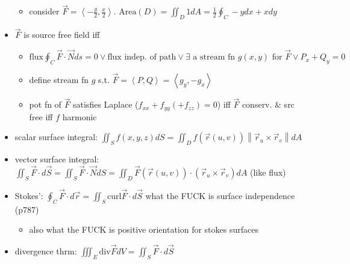\documentclass[11pt]{article}
\theoremstyle{definition}
\newcommand{\magn}[1]{\left\lVert #1 \right\rVert}
\begin{document}
\begin{itemize}
\begin{itemize}
    \item consider $\vec{F}=\left<-\frac{y}{2},\frac{x}{2}\right>$. $\text{Area}(D)=\iint_D1dA = \frac{1}{2}\oint_C -ydx+xdy$
  \end{itemize}
  \item $\vec{F}$ is source free field iff 
  \begin{itemize}
    \item $\text{flux} \oint_C\vec{F}\cdot\vec{N}ds = 0 \lor \text{flux indep. of path} \lor \exists\text{ a stream fn } g(x,y) \text{ for } \vec{F} \lor P_x+Q_y=0$
    \item define stream fn $g$ s.t. $\vec{F} = \left<P,Q\right> = \left<g_y,-g_x\right>$
    \item pot fn of $\vec{F}$ satisfies Laplace ($f_{xx}+f_{yy}(+f_{zz})=0$) iff $\vec{F}$ conserv. \& src free iff $f$ harmonic
  \end{itemize}
  \vspace*{-1em}
  \item scalar surface integral: $\iint_S f(x,y,z)dS = \iint_D f(\vec{r}(u,v))\magn{\vec{r}_u\times\vec{r}_v}dA$
  \item vector surface integral: $\iint_S \vec{F}\cdot d\vec{S} = \iint_S \vec{F}\cdot\vec{N}dS = \iint_D \vec{F}(\vec{r}(u,v))\cdot(\vec{r}_u \times\vec{r}_v) dA$ (like flux)
  \item Stokes': $\oint_C \vec{F}\cdot d\vec{r} = \iint_S \text{curl}\vec{F}\cdot d\vec{S}$ what the FUCK is surface independence (p787)
  \begin{itemize}
    \item also what the FUCK is positive orientation for stokes surfaces
  \end{itemize}
  \item divergence thrm: $\iiint_E \text{div}\vec{F}dV = \iint_S \vec{F}\cdot d\vec{S}$
  
  
  



\end{itemize}
\end{document}
